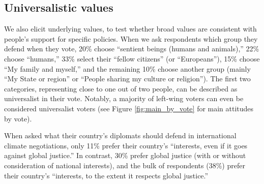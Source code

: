 \subsection{Universalistic values}\label{subsec:universalistic}

We also elicit underlying values, to test whether broad values are consistent with people's support for specific policies. %
When we ask respondents which group they defend when they vote, %
20\% choose ``sentient beings (humans and animals),'' 22\% choose ``humans,'' 33\% select their ``fellow citizens'' (or ``Europeans''), 15\% choose ``My family and myself,'' and the remaining 10\% choose another group (mainly ``My State or region'' or ``People sharing my culture or religion''). The first two categories, representing close to one out of two people, can be described as universalist in their vote. Notably,  a majority of left-wing voters can even be considered universalist voters (see Figure \ref{fig:main_by_vote} for main attitudes by vote).%

When asked what their country's diplomats should defend in international climate negotiations, only 11\% prefer their country's ``interests, even if it goes against global justice.'' In contrast, 30\% prefer global justice (with or without consideration of national interests), and the bulk of respondents (38\%) prefer their country's ``interests, to the extent it respects global justice.''

